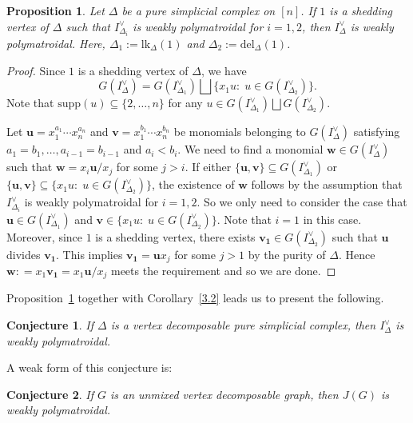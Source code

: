 \documentclass[12pt]{amsart}
\let\:=\colon
\newtheorem{Proposition}[Theorem]{Proposition}
\newtheorem{Conjecture}{Conjecture}
\begin{document}
\begin{Proposition}\label{3.4} Let $\Delta$ be a pure simplicial complex on $[n]$. If $1$ is a shedding vertex of $\Delta$ such that $I_{\Delta_i}^{\vee}$ is weakly polymatroidal for $i=1,2$, then $I_{\Delta}^{\vee}$ is weakly polymatroidal. Here, $\Delta_1:=\mathrm{lk}_{\Delta}(1)$
and $\Delta_2:=\mathrm{del}_{\Delta}(1)$.
\end{Proposition}
\begin{proof} Since $1$ is a shedding vertex of $\Delta$, we have \begin{equation*}
 G(I_{\Delta}^{\vee})=G(I_{\Delta_1}^{\vee})\bigsqcup \{x_1u\:\; u\in G(I_{\Delta_2}^{\vee})\}.
 \end{equation*}
 Note that  $\mathrm{supp}(u)\subseteq \{2,\ldots,n\}$ for any $u\in G(I_{\Delta_1}^{\vee})\bigsqcup  G(I_{\Delta_2}^{\vee})$.

 Let $\mathbf{u}=x_1^{a_1}\cdots x_n^{a_n}$ and $\mathbf{v}=x_1^{b_1}\cdots x_n^{b_n}$ be monomials belonging to $G(I_{\Delta}^{\vee})$ satisfying $a_1=b_1,\ldots,a_{i-1}=b_{i-1}$ and $a_i<b_i$. We need to find a monomial $\mathbf{w}\in G(I_{\Delta}^{\vee})$ such that $\mathbf{w}=x_i\mathbf{u}/x_j$ for some $j>i$.  If either $\{\mathbf{u,v}\}\subseteq G(I_{\Delta_1}^{\vee})$ or  $\{\mathbf{u,v}\}\subseteq \{x_1u\:\; u\in G(I_{\Delta_2}^{\vee})\}$, the existence of $\mathbf{w}$ follows by the assumption that $I_{\Delta_i}^{\vee}$ is weakly polymatroidal for $i=1,2$. So we only need to consider the case that $\mathbf{u}\in G(I_{\Delta_1}^{\vee})$ and $\mathbf{v}\in \{x_1u\:\; u\in G(I_{\Delta_2}^{\vee})\}$. Note that $i=1$ in this case.  Moreover, since $1$ is a shedding vertex, there exists  $\mathbf{v_1}\in G(I_{\Delta_2}^{\vee})$ such that $\mathbf{u}$ divides $\mathbf{v_1}$.   This implies $\mathbf{v_1}=\mathbf{u}x_j$ for some $j>1$ by the purity of $\Delta$. Hence $\mathbf{w:}=  x_1\mathbf{v_1}=x_1\mathbf{u}/x_j$ meets the requirement and so we are done. \end{proof}


 Proposition~\ref{3.4} together with Corollary~\ref{3.2} leads us to present the following.

\begin{Conjecture} If $\Delta$ is a vertex decomposable  pure simplicial complex, then $I_{\Delta}^{\vee}$ is weakly polymatroidal.
\end{Conjecture}

A weak form of this conjecture is:

\begin{Conjecture} If $G$ is an unmixed vertex decomposable graph, then $J(G)$ is weakly polymatroidal.
\end{Conjecture}
\end{document}
